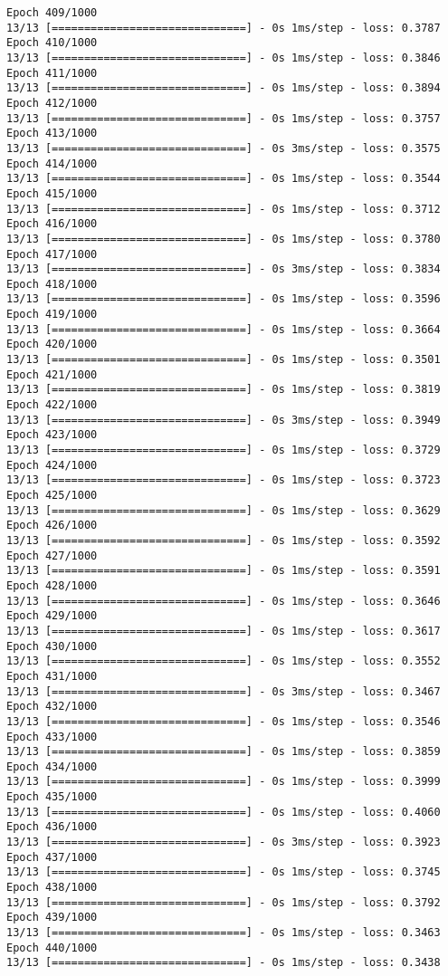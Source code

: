 \documentclass[11pt]{article}
\begin{document}
\begin{Verbatim}[commandchars=\\\{\}]
Epoch 409/1000
13/13 [==============================] - 0s 1ms/step - loss: 0.3787
Epoch 410/1000
13/13 [==============================] - 0s 1ms/step - loss: 0.3846
Epoch 411/1000
13/13 [==============================] - 0s 1ms/step - loss: 0.3894
Epoch 412/1000
13/13 [==============================] - 0s 1ms/step - loss: 0.3757
Epoch 413/1000
13/13 [==============================] - 0s 3ms/step - loss: 0.3575
Epoch 414/1000
13/13 [==============================] - 0s 1ms/step - loss: 0.3544
Epoch 415/1000
13/13 [==============================] - 0s 1ms/step - loss: 0.3712
Epoch 416/1000
13/13 [==============================] - 0s 1ms/step - loss: 0.3780
Epoch 417/1000
13/13 [==============================] - 0s 3ms/step - loss: 0.3834
Epoch 418/1000
13/13 [==============================] - 0s 1ms/step - loss: 0.3596
Epoch 419/1000
13/13 [==============================] - 0s 1ms/step - loss: 0.3664
Epoch 420/1000
13/13 [==============================] - 0s 1ms/step - loss: 0.3501
Epoch 421/1000
13/13 [==============================] - 0s 1ms/step - loss: 0.3819
Epoch 422/1000
13/13 [==============================] - 0s 3ms/step - loss: 0.3949
Epoch 423/1000
13/13 [==============================] - 0s 1ms/step - loss: 0.3729
Epoch 424/1000
13/13 [==============================] - 0s 1ms/step - loss: 0.3723
Epoch 425/1000
13/13 [==============================] - 0s 1ms/step - loss: 0.3629
Epoch 426/1000
13/13 [==============================] - 0s 1ms/step - loss: 0.3592
Epoch 427/1000
13/13 [==============================] - 0s 1ms/step - loss: 0.3591
Epoch 428/1000
13/13 [==============================] - 0s 1ms/step - loss: 0.3646
Epoch 429/1000
13/13 [==============================] - 0s 1ms/step - loss: 0.3617
Epoch 430/1000
13/13 [==============================] - 0s 1ms/step - loss: 0.3552
Epoch 431/1000
13/13 [==============================] - 0s 3ms/step - loss: 0.3467
Epoch 432/1000
13/13 [==============================] - 0s 1ms/step - loss: 0.3546
Epoch 433/1000
13/13 [==============================] - 0s 1ms/step - loss: 0.3859
Epoch 434/1000
13/13 [==============================] - 0s 1ms/step - loss: 0.3999
Epoch 435/1000
13/13 [==============================] - 0s 1ms/step - loss: 0.4060
Epoch 436/1000
13/13 [==============================] - 0s 3ms/step - loss: 0.3923
Epoch 437/1000
13/13 [==============================] - 0s 1ms/step - loss: 0.3745
Epoch 438/1000
13/13 [==============================] - 0s 1ms/step - loss: 0.3792
Epoch 439/1000
13/13 [==============================] - 0s 1ms/step - loss: 0.3463
Epoch 440/1000
13/13 [==============================] - 0s 1ms/step - loss: 0.3438

\end{Verbatim}
\end{document}
